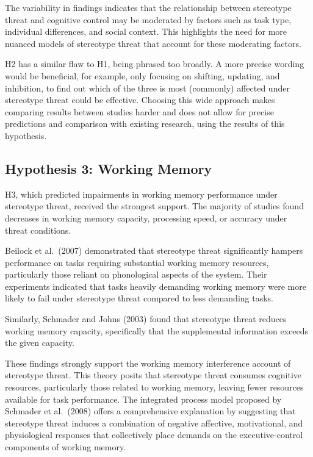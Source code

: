 \documentclass[
  stu, a4paper,floatsintext]{apa7}
\begin{document}
The variability in findings indicates that the relationship between stereotype threat and cognitive control may be moderated by factors such as task type, individual differences, and social context. This highlights the need for more nuanced models of stereotype threat that account for these moderating factors.

H2 has a similar flaw to H1, being phrased too broadly. A more precise wording would be beneficial, for example, only focusing on shifting, updating, and inhibition, to find out which of the three is most (commonly) affected under stereotype threat could be effective. Choosing this wide approach makes comparing results between studies harder and does not allow for precise predictions and comparison with existing research, using the results of this hypothesis.

\subsection{Hypothesis 3: Working Memory}\label{hypothesis-3-working-memory}

H3, which predicted impairments in working memory performance under stereotype threat, received the strongest support. The majority of studies found decreases in working memory capacity, processing speed, or accuracy under threat conditions.

Beilock et al.~(2007) demonstrated that stereotype threat significantly hampers performance on tasks requiring substantial working memory resources, particularly those reliant on phonological aspects of the system. Their experiments indicated that tasks heavily demanding working memory were more likely to fail under stereotype threat compared to less demanding tasks.

Similarly, Schmader and Johns (2003) found that stereotype threat reduces working memory capacity, specifically that the supplemental information exceeds the given capacity.

These findings strongly support the working memory interference account of stereotype threat. This theory posits that stereotype threat consumes cognitive resources, particularly those related to working memory, leaving fewer resources available for task performance. The integrated process model proposed by Schmader et al.~(2008) offers a comprehensive explanation by suggesting that stereotype threat induces a combination of negative affective, motivational, and physiological responses that collectively place demands on the executive-control components of working memory.
\end{document}
